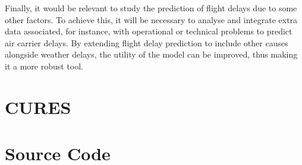 \documentclass[12pt,oneside]{book} %
\begin{document}
\noindent Finally, it would be relevant to study the prediction of flight delays due to some other factors. To achieve this, it will be necessary to analyse and integrate extra data associated, for instance, with operational or technical problems to predict air carrier delays. By extending flight delay prediction to include other causes alongside weather delays, the utility of the model can be improved, thus making it a more robust tool.

%


\appendix
\chapter{CURES}
\vspace{0.2cm}
\begin{figure}[H]
    
\end{figure}

\clearpage
\chapter{Source Code}

\begin{figure}[H]
    
\end{figure}



\end{document}
